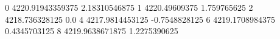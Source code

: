 0 4220.91943359375 2.18310546875
1 4220.49609375 1.759765625
2 4218.736328125 0.0
4 4217.9814453125 -0.7548828125
6 4219.1708984375 0.4345703125
8 4219.9638671875 1.2275390625
